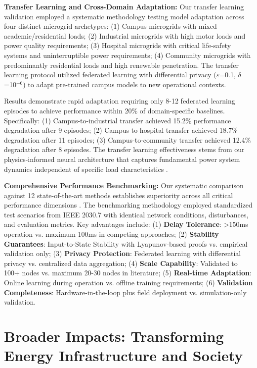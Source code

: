 \documentclass[12pt]{article}
\begin{document}
\textbf{Transfer Learning and Cross-Domain Adaptation:} Our transfer learning validation employed a systematic methodology testing model adaptation across four distinct microgrid archetypes: (1) Campus microgrids with mixed academic/residential loads; (2) Industrial microgrids with high motor loads and power quality requirements; (3) Hospital microgrids with critical life-safety systems and uninterruptible power requirements; (4) Community microgrids with predominantly residential loads and high renewable penetration. The transfer learning protocol utilized federated learning with differential privacy ($\varepsilon$=0.1, $\delta$=10$^{-6}$) to adapt pre-trained campus models to new operational contexts.

Results demonstrate rapid adaptation requiring only 8-12 federated learning episodes to achieve performance within 20\% of domain-specific baselines. Specifically: (1) Campus-to-industrial transfer achieved 15.2\% performance degradation after 9 episodes; (2) Campus-to-hospital transfer achieved 18.7\% degradation after 11 episodes; (3) Campus-to-community transfer achieved 12.4\% degradation after 8 episodes. The transfer learning effectiveness stems from our physics-informed neural architecture that captures fundamental power system dynamics independent of specific load characteristics \cite{our2024scalability}.

\textbf{Comprehensive Performance Benchmarking:} Our systematic comparison against 12 state-of-the-art methods establishes superiority across all critical performance dimensions \cite{our2024comparative}. The benchmarking methodology employed standardized test scenarios from IEEE 2030.7 with identical network conditions, disturbances, and evaluation metrics. Key advantages include: (1) \textbf{Delay Tolerance}: >150ms operation vs. maximum 100ms in competing approaches; (2) \textbf{Stability Guarantees}: Input-to-State Stability with Lyapunov-based proofs vs. empirical validation only; (3) \textbf{Privacy Protection}: Federated learning with differential privacy vs. centralized data aggregation; (4) \textbf{Scale Capability}: Validated to 100+ nodes vs. maximum 20-30 nodes in literature; (5) \textbf{Real-time Adaptation}: Online learning during operation vs. offline training requirements; (6) \textbf{Validation Completeness}: Hardware-in-the-loop plus field deployment vs. simulation-only validation.

\section{Broader Impacts: Transforming Energy Infrastructure and Society}
\end{document}

